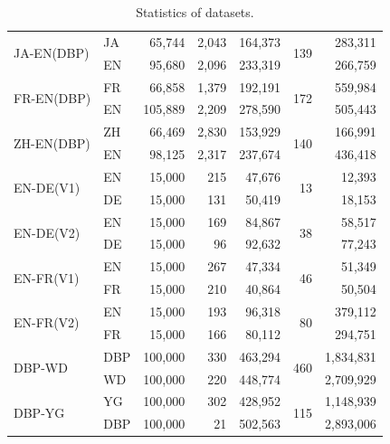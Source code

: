 \documentclass{article}
\begin{document}
\begin{table}[t]
{{\begin{tabular}{llr|rr|rr}
		\midrule
		\multirow{2}{*}{JA-EN(DBP)}	
		&JA		&65,744	&2,043	&164,373	&\multirow{2}{*}{139}	&283,311	\\
		&EN		&95,680	&2,096	&233,319	&						&266,759	\\
		\multirow{2}{*}{FR-EN(DBP)}	
		&FR		&66,858	&1,379	&192,191	&\multirow{2}{*}{172}	&559,984	\\
		&EN		&105,889	&2,209	&278,590	&					&505,443	\\
		\multirow{2}{*}{ZH-EN(DBP)}	
		&ZH		&66,469	&2,830	&153,929	&\multirow{2}{*}{140}	&166,991	\\
		&EN		&98,125	&2,317	&237,674	&						&436,418	\\
		\midrule
		\multirow{2}{*}{EN-DE(V1)}  
		&EN		&15,000	&215	&47,676	&\multirow{2}{*}{13}	&12,393	\\
		&DE		&15,000	&131	&50,419	&						&18,153	\\
		\multirow{2}{*}{EN-DE(V2)}  
		&EN		&15,000	&169	&84,867	&\multirow{2}{*}{38}	&58,517	\\
		&DE		&15,000	&96	 &92,632	&						&77,243	\\
		\multirow{2}{*}{EN-FR(V1)}  
		&EN		&15,000	&267	&47,334	&\multirow{2}{*}{46}	&51,349	\\
		&FR		&15,000	&210	&40,864	&						&50,504	\\
		\multirow{2}{*}{EN-FR(V2)}  
		&EN		&15,000	&193	&96,318	&\multirow{2}{*}{80}	&379,112	\\
		&FR		&15,000	&166	&80,112	&						&294,751	\\
		\midrule
		\multirow{2}{*}{DBP-WD}     
		&DBP	&100,000	&330	&463,294	&\multirow{2}{*}{460}	&1,834,831	\\
		&WD		&100,000	&220	&448,774	&						&2,709,929	\\
		\multirow{2}{*}{DBP-YG}     
		&YG		&100,000	&302	&428,952	&\multirow{2}{*}{115}	&1,148,939	\\
		&DBP	&100,000	&21		&502,563	&						&2,893,006	\\
		\bottomrule
	\end{tabular}
}}
	\caption{Statistics of datasets.}
	\label{tb1}
\end{table}
\end{document}
